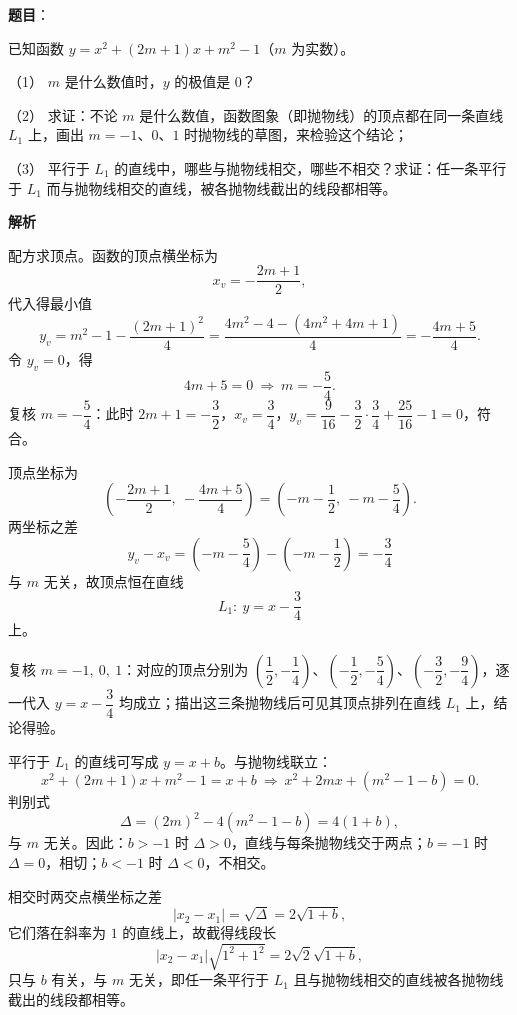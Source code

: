 \begin{answer}

\textbf{题目}：

已知函数 $y=x^2+(2m+1)x+m^2-1$（$m$ 为实数）。

（1） $m$ 是什么数值时，$y$ 的极值是 $0$？

（2） 求证：不论 $m$ 是什么数值，函数图象（即抛物线）的顶点都在同一条直线 $L_1$ 上，画出 $m=-1$、$0$、$1$ 时抛物线的草图，来检验这个结论；

（3） 平行于 $L_1$ 的直线中，哪些与抛物线相交，哪些不相交？求证：任一条平行于 $L_1$ 而与抛物线相交的直线，被各抛物线截出的线段都相等。

\textbf{解析}


配方求顶点。函数的顶点横坐标为
\nopagebreak[4]
\[
x_v=-\frac{2m+1}{2},
\]
代入得最小值
\nopagebreak[4]
\[
y_v=m^2-1-\frac{(2m+1)^2}{4}=\frac{4m^2-4-(4m^2+4m+1)}{4}=-\frac{4m+5}{4}.
\]
令 $y_v=0$，得
\nopagebreak[4]
\[
4m+5=0\ \Longrightarrow\ m=-\frac54.
\]
复核 $m=-\dfrac54$：此时 $2m+1=-\dfrac32$，$x_v=\dfrac34$，$y_v=\dfrac9{16}-\dfrac32\cdot\dfrac34+\dfrac{25}{16}-1=0$，符合。


顶点坐标为
\nopagebreak[4]
\[
\left(-\frac{2m+1}{2},\ -\frac{4m+5}{4}\right)=\left(-m-\frac12,\ -m-\frac54\right).
\]
两坐标之差
\nopagebreak[4]
\[
y_v-x_v=\left(-m-\frac54\right)-\left(-m-\frac12\right)=-\frac34
\]
与 $m$ 无关，故顶点恒在直线
\nopagebreak[4]
\[
L_1:\ y=x-\frac34
\]
上。

复核 $m=-1,\ 0,\ 1$：对应的顶点分别为 $\left(\dfrac12,-\dfrac14\right)$、$\left(-\dfrac12,-\dfrac54\right)$、$\left(-\dfrac32,-\dfrac94\right)$，逐一代入 $y=x-\dfrac34$ 均成立；描出这三条抛物线后可见其顶点排列在直线 $L_1$ 上，结论得验。


平行于 $L_1$ 的直线可写成 $y=x+b$。与抛物线联立：
\nopagebreak[4]
\[
x^2+(2m+1)x+m^2-1=x+b
\ \Longrightarrow\ x^2+2mx+(m^2-1-b)=0.
\]
判别式
\nopagebreak[4]
\[
\Delta=(2m)^2-4(m^2-1-b)=4(1+b),
\]
与 $m$ 无关。因此：$b>-1$ 时 $\Delta>0$，直线与每条抛物线交于两点；$b=-1$ 时 $\Delta=0$，相切；$b<-1$ 时 $\Delta<0$，不相交。

相交时两交点横坐标之差
\nopagebreak[4]
\[
|x_2-x_1|=\sqrt{\Delta}=2\sqrt{1+b},
\]
它们落在斜率为 $1$ 的直线上，故截得线段长
\nopagebreak[4]
\[
|x_2-x_1|\sqrt{1^2+1^2}=2\sqrt2\sqrt{1+b},
\]
只与 $b$ 有关，与 $m$ 无关，即任一条平行于 $L_1$ 且与抛物线相交的直线被各抛物线截出的线段都相等。


\end{answer}
